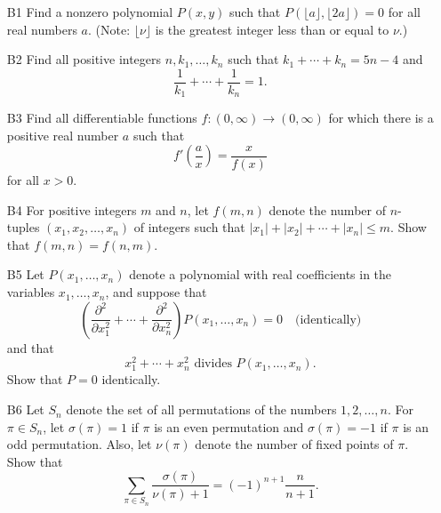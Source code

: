 \documentclass[amssymb,twocolumn,pra,10pt,aps]{revtex4-1}
\begin{document}
\begin{itemize}
\item[B1]
Find a nonzero polynomial $P(x,y)$ such that $P(\lfloor a \rfloor,
\lfloor 2a \rfloor) = 0$ for all real numbers $a$.
(Note: $\lfloor \nu \rfloor$ is the greatest integer less than
or equal to $\nu$.)

\item[B2]
Find all positive integers $n, k_1, \dots, k_n$ such that
$k_1 + \cdots + k_n = 5n-4$ and
\[
\frac{1}{k_1} + \cdots + \frac{1}{k_n} = 1.
\]

\item[B3]
Find all differentiable functions $f: (0, \infty) \to (0, \infty)$ for which
there is a positive real number $a$ such that
\[
f' \left( \frac{a}{x} \right) = \frac{x}{f(x)}
\]
for all $x > 0$.

\item[B4]
For positive integers $m$ and $n$, let $f(m,n)$ denote the number of
$n$-tuples $(x_1,x_2,\dots,x_n)$ of integers such that
$|x_1| + |x_2| + \cdots + |x_n| \leq m$.
Show that $f(m,n) = f(n,m)$.

\item[B5]
Let $P(x_1,\dots,x_n)$ denote a polynomial with real coefficients in the
variables $x_1, \dots, x_n$, and suppose that
\[
\left( \frac{\partial^2}{\partial x_1^2} + \cdots + \frac{\partial^2}{\partial
x_n^2}\right) P(x_1, \dots,x_n) = 0 \quad \mbox{(identically)}
\] %
and that
\[
x_1^2 + \cdots + x_n^2 \mbox{ divides } P(x_1, \dots, x_n).
\] %
Show that $P=0$ identically.

\item[B6]
Let $S_n$ denote the set of all permutations of the numbers $1,2,\dots,n$.
For $\pi \in S_n$, let $\sigma(\pi) = 1$ if $\pi$ is an even permutation
and $\sigma(\pi) = -1$ if $\pi$ is an odd permutation.
Also, let $\nu(\pi)$ denote the number of fixed points of $\pi$.
Show that
\[
\sum_{\pi \in S_n} \frac{\sigma(\pi)}{\nu(\pi) + 1} = (-1)^{n+1}
\frac{n}{n+1}.
\]
\end{itemize}
\end{document}
